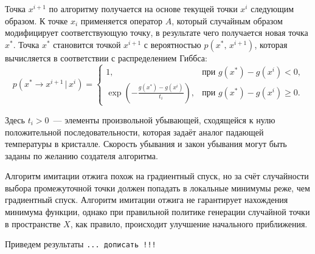Точка $x^{i+1}$ по алгоритму получается на основе текущей точки $x^i$ следующим образом. К точке $x_i$ применяется оператор $A$, который случайным образом модифицирует соответствующую точку, в результате чего получается новая точка $x^*$. Точка $x^*$ становится точкой $x^{i+1}$ с вероятностью $p(x^*,\,x^{i+1})$, которая вычисляется в соответствии с распределением Гиббса:
$$
        p(x^*\to x^{i+1}\,|\,x^i)
=
        \begin{cases}
1,
        &
\mbox{при $g(x^*) - g(x^i) < 0$,}
        \\
\exp\left(-\frac{g(x^*) - g(x^i)}{t_i}\right),
        &
\mbox{при $g(x^*) - g(x^i) \geqslant 0$}.
\end{cases}
$$

Здесь $t_i>0$~--- элементы произвольной убывающей, сходящейся к нулю положительной последовательности, которая задаёт аналог падающей температуры в кристалле. Скорость убывания и закон убывания могут быть заданы по желанию создателя алгоритма.

Алгоритм имитации отжига похож на градиентный спуск, но за счёт случайности выбора промежуточной точки должен попадать в локальные минимумы реже, чем градиентный спуск. Алгоритм имитации отжига не гарантирует нахождения минимума функции, однако при правильной политике генерации случайной точки в пространстве $X$, как правило, происходит улучшение начального приближения.

Приведем результаты \texttt{... дописать !!!}

